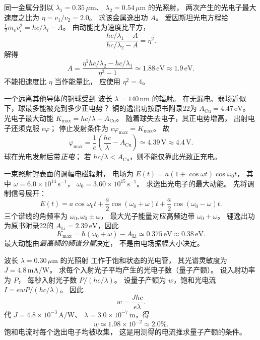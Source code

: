 同一金属分别以
$\lambda_1=0.35\,\mu\mathrm m$、
$\lambda_2=0.54\,\mu\mathrm m$ 的光照射，
两次产生的光电子最大速度之比为
$\eta=v_1/v_2=2.0$。
求该金属逸出功 $A$。
\exsolution
爱因斯坦光电方程给
$\tfrac12m_ev_i^2=hc/\lambda_i-A$。
由动能比为速度比平方，
\[
 \frac{hc/\lambda_1-A}
 {hc/\lambda_2-A}=\eta^2.
\]
解得
\[
 \boxed{A=
 \frac{\eta^2hc/\lambda_2-hc/\lambda_1}
 {\eta^2-1}
 \simeq1.88\,\mathrm{eV}\approx1.9\,\mathrm{eV}}.
\]
\excheck 不能把速度比 $\eta$ 当作能量比，
应使用 $\eta^2=4$。

一个远离其他导体的铜球受到
波长 $\lambda=140\,\mathrm{nm}$ 的辐射。
在无漏电、弱场近似下，球最多能被充到多少正电势？
\exsolution
铜的逸出功按原书附录22为
$A_{\mathrm{Cu}}=4.47\,\mathrm{eV}$。
光电子最大动能
$K_{\max}=hc/\lambda-A_{\mathrm{Cu}}$。
随着球失去电子，其正电势增高，
出射电子还须克服 $e\varphi$；
停止发射条件为 $e\varphi_{\max}=K_{\max}$。
故
\[
 \boxed{\varphi_{\max}=
 \frac1e\left(\frac{hc}{\lambda}-A_{\mathrm{Cu}}\right)
 \simeq4.39\,\mathrm V\approx4.4\,\mathrm V}.
\]
\excheck 球在光电发射后带\emph{正电}；
若 $hc/\lambda<A_{\mathrm{Cu}}$，则不能仅靠此光致正充电。

一束照射锂表面的调幅电磁辐射，
电场为
$E(t)=a(1+\cos\omega t)\cos\omega_0t$，
其中 $\omega=6.0\times10^{14}\,\mathrm{s^{-1}}$，
$\omega_0=3.60\times10^{15}\,\mathrm{s^{-1}}$。
求逸出光电子的最大动能。
\exsolution
先将调制信号展开：
\[
 E(t)=a\cos\omega_0t+
 \frac a2\cos(\omega_0+\omega)t+
 \frac a2\cos(\omega_0-\omega)t.
\]
三个谱线的角频率为
$\omega_0,\omega_0\pm\omega$，
最大光子能量对应高频边带 $\omega_0+\omega$。
锂逸出功为原书附录22的
$A_{\mathrm{Li}}=2.39\,\mathrm{eV}$，因此
\[
 \boxed{K_{\max}=
 \hbar(\omega_0+\omega)-A_{\mathrm{Li}}
 \simeq0.375\,\mathrm{eV}\approx0.38\,\mathrm{eV}}.
\]
\excheck 最大动能由\emph{最高频的频谱分量}决定，
不是由电场振幅大小决定。

波长 $\lambda=0.30\,\mu\mathrm m$ 的光照射
工作于饱和状态的光电管，
其光谱灵敏度为
$J=4.8\,\mathrm{mA/W}$。
求每个入射光子平均产生的光电子数（量子产额）。
\exsolution
设入射功率为 $P$，
每秒入射光子数 $P/(hc/\lambda)$。
设量子产额为 $w$，饱和光电流
$I=e wP/(hc/\lambda)$。
因此
\[
 \boxed{w=\frac{Jhc}{e\lambda}}.
\]
代 $J=4.8\times10^{-3}\,\mathrm{A/W}$、
$\lambda=3.0\times10^{-7}\,\mathrm m$，得
\[
 \boxed{w\simeq1.98\times10^{-2}\approx2.0\%}.
\]
\excheck 饱和电流时每个逸出电子均被收集，
这是用测得的电流推求量子产额的条件。

